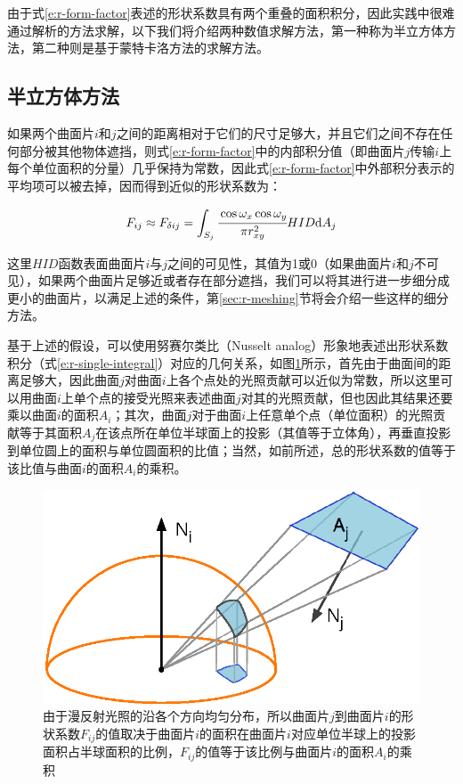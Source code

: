 由于式\ref{e:r-form-factor}表述的形状系数具有两个重叠的面积积分，因此实践中很难通过解析的方法求解，以下我们将介绍两种数值求解方法，第一种称为半立方体方法，第二种则是基于蒙特卡洛方法的求解方法。




\subsection{半立方体方法}\label{sec:the-hemi-cube}
如果两个曲面片$i$和$j$之间的距离相对于它们的尺寸足够大，并且它们之间不存在任何部分被其他物体遮挡，则式\ref{e:r-form-factor}中的内部积分值（即曲面片$j$传输$i$上每个单位面积的分量）几乎保持为常数，因此式\ref{e:r-form-factor}中外部积分表示的平均项可以被去掉，因而得到近似的形状系数为：

\begin{equation}\label{e:r-single-integral}
	F_{ij}\approx F_{\delta ij}=\int_{S_j} \cfrac{\cos{\omega}_x \cos{\omega}_y}{\pi r^{2}_{xy}} HID {\rm d}A_j
\end{equation}

\noindent 这里$HID$函数表面曲面片$i$与$j$之间的可见性，其值为1或0（如果曲面片$i$和$j$不可见），如果两个曲面片足够近或者存在部分遮挡，我们可以将其进行进一步细分成更小的曲面片，以满足上述的条件，第\ref{sec:r-meshing}节将会介绍一些这样的细分方法。

基于上述的假设，可以使用努赛尔类比（Nusselt analog）形象地表述出形状系数积分（式\ref{e:r-single-integral}）对应的几何关系，如图\ref{f:r-nusselt-analog}所示，首先由于曲面间的距离足够大，因此曲面$j$对曲面$i$上各个点处的光照贡献可以近似为常数，所以这里可以用曲面$i$上单个点的接受光照来表述曲面$j$对其的光照贡献，但也因此其结果还要乘以曲面$i$的面积$A_i$；其次，曲面$j$对于曲面$i$上任意单个点（单位面积）的光照贡献等于其面积$A_j$在该点所在单位半球面上的投影（其值等于立体角），再垂直投影到单位圆上的面积与单位圆面积的比值；当然，如前所述，总的形状系数的值等于该比值与曲面$i$的面积$A_i$的乘积。

\begin{figure}
\sidecaption
	\includegraphics[width=.5\textwidth]{figures/r/nusselt-analog}
	\caption{由于漫反射光照的沿各个方向均匀分布，所以曲面片$j$到曲面片$i$的形状系数$F_{ij}$的值取决于曲面片$i$的面积在曲面片$i$对应单位半球上的投影面积占半球面积的比例，$F_{ij}$的值等于该比例与曲面片$i$的面积$A_i$的乘积}
	\label{f:r-nusselt-analog}
\end{figure}

